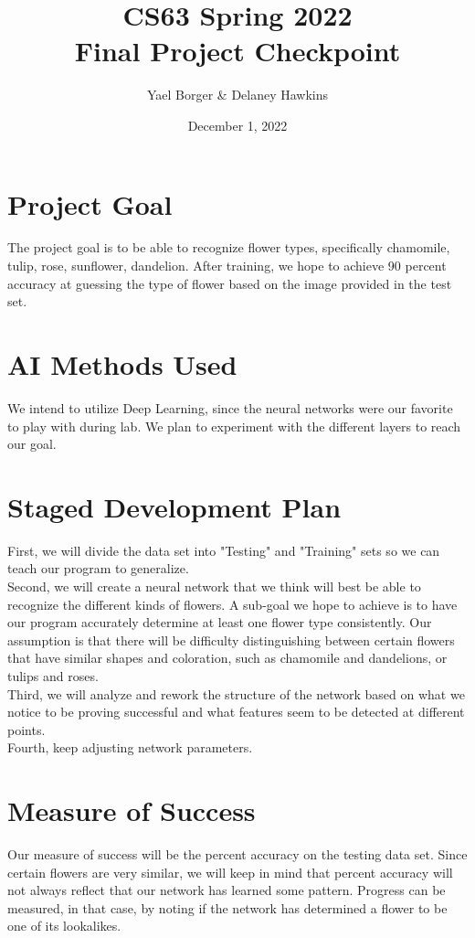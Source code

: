 \documentclass[11pt]{article}
\title{CS63 Spring 2022\\Final Project Checkpoint}
\author{Yael Borger & Delaney Hawkins}
\date{December 1, 2022}
\begin{document}
\maketitle

\section{Project Goal}

The project goal is to be able to recognize flower types, specifically chamomile, tulip, rose, sunflower, dandelion. After training, we hope to achieve 90 percent accuracy at guessing the type of flower based on the image provided in the test set. 

\section{AI Methods Used}

We intend to utilize Deep Learning, since the neural networks were our favorite to play with during lab. We plan to experiment with the different layers to reach our goal. 

\section{Staged Development Plan}

First, we will divide the data set into "Testing" and "Training" sets so we can teach our program to generalize. \\
Second, we will create a neural network that we think will best be able to recognize the different kinds of flowers. A sub-goal we hope to achieve is to have our program accurately determine at least one flower type consistently. Our assumption is that there will be difficulty distinguishing between certain flowers that have similar shapes and coloration, such as chamomile and dandelions, or tulips and roses. \\
Third, we will analyze and rework the structure of the network based on what we notice to be proving successful and what features seem to be detected at different points.\\
Fourth, keep adjusting network parameters.\\

\section{Measure of Success}

Our measure of success will be the percent accuracy on the testing data set. Since certain flowers are very similar, we will keep in mind that percent accuracy will not always reflect that our network has learned some pattern. Progress can be measured, in that case, by noting if the network has determined a flower to be one of its lookalikes.
\end{document}
